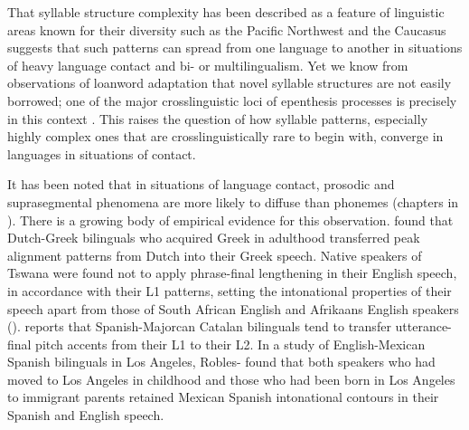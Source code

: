   That syllable structure complexity has been described as a feature of linguistic areas known for their diversity such as the Pacific Northwest and the Caucasus suggests that such patterns can spread from one language to another in situations of heavy language contact and bi- or multilingualism. Yet we know from observations of loanword adaptation that novel syllable structures are not easily borrowed; one of the major crosslinguistic loci of epenthesis processes is precisely in this context \citep{Hall2011}. This raises the question of how syllable patterns, especially highly complex ones that are crosslinguistically rare to begin with, converge in languages in situations of contact.

  It has been noted that in situations of language contact, prosodic and suprasegmental phenomena are more likely to diffuse than phonemes (chapters in \citealt{AikhenvaldDixon2001b}). There is a growing body of empirical evidence for this observation. \citet{Mennen2004} found that Dutch-Greek bilinguals who acquired Greek in adulthood transferred peak alignment patterns from Dutch into their Greek speech. Native speakers of Tswana were found not to apply phrase-final lengthening in their English speech, in accordance with their L1 patterns, setting the intonational properties of their speech apart from those of South African English and Afrikaans English speakers (\citealt{CoetzeeWissing2007}). \citet{Simonet2011} reports that Spanish-Majorcan Catalan bilinguals tend to transfer utterance-final pitch accents from their L1 to their L2. In a study of English-Mexican Spanish bilinguals in Los Angeles, Robles-\citet{Puente2014} found that both speakers who had moved to Los Angeles in childhood and those who had been born in Los Angeles to immigrant parents retained Mexican Spanish intonational contours in their Spanish and English speech.

